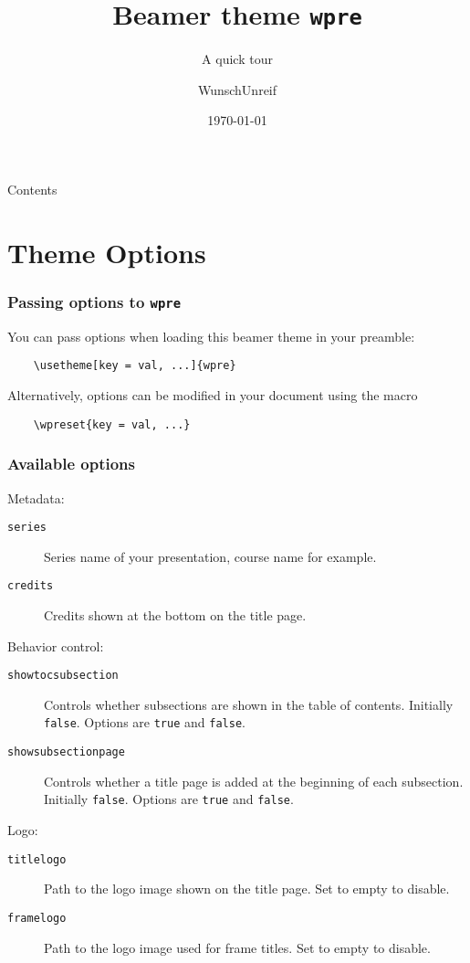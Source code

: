 \documentclass[no-math, aspectratio=1610, 10pt]{beamer}
\title{Beamer theme \texttt{wpre}}
\subtitle{A quick tour}
\author{WunschUnreif}
\institute{Basics, SJTU}
\date{\today}
\begin{document}
    \maketitle

    \begin{frame}{Contents}
        \tableofcontents
    \end{frame}

    \section{Theme Options}

    \begin{frame}[fragile]
        \frametitle{Passing options to \texttt{wpre}}
        You can pass options when loading this beamer theme in your preamble:
        \begin{verbatim}
    \usetheme[key = val, ...]{wpre}
        \end{verbatim}
        Alternatively, options can be modified in your document using the macro 
        \begin{verbatim}
    \wpreset{key = val, ...}
        \end{verbatim}
    \end{frame}

    \begin{frame}
        \frametitle{Available options}
    
        Metadata:
        \begin{description}
            \item[\texttt{series}] Series name of your presentation, course name for example.
            \item[\texttt{credits}] Credits shown at the bottom on the title page. 
        \end{description}

        Behavior control:
        \begin{description}
            \item[\texttt{showtocsubsection}] Controls whether subsections are shown in the table of contents. Initially \texttt{false}. Options are \texttt{true} and \texttt{false}.
            \item[\texttt{showsubsectionpage}] Controls whether a title page is added at the beginning of each subsection. Initially \texttt{false}. Options are \texttt{true} and \texttt{false}.
        \end{description}

        Logo:
        \begin{description}
            \item[\texttt{titlelogo}] Path to the logo image shown on the title page. Set to empty to disable.
            \item[\texttt{framelogo}] Path to the logo image used for frame titles. Set to empty to disable. 
        \end{description}
    
    \end{frame}
\end{document}
